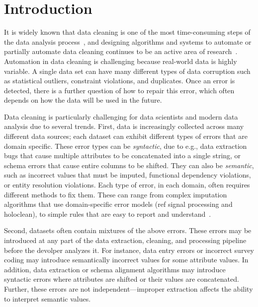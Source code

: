 \section{Introduction}\label{intro}\sloppy

It is widely known that data cleaning is one of the most time-consuming steps of the data analysis process~\cite{nytimes}, and designing algorithms and systems to automate or partially automate data cleaning continues to be an active area of research~\cite{DBLP:conf/sigmod/ChuIKW16}.  Automation in data cleaning is challenging because real-world data is highly variable.  A single data set can have many different types of data corruption such as statistical outliers, constraint violations, and duplicates.  Once an error is detected, there is a further question of how to repair this error, which often depends on how the data will be used in the future.

Data cleaning is particularly challenging for data scientists and modern data analysis due to several trends.  First, data is increasingly collected across many different data sources; each dataset can exhibit different types of errors that are domain specific.  These error types can be {\it syntactic}, due to e.g., data extraction bugs that cause multiple attributes to be concatenated into a single string, or schema errors that cause entire columns to be shifted.  They can also be {\it semantic}, such as incorrect values that must be imputed, functional dependency violations, or entity resolution violations.   Each type of error, in each domain, often requires different methods to fix them.  These can range from complex imputation algorithms that use domain-specific error models (ref signal processing and holoclean), to simple rules that are easy to report and understand~\cite{}.  

Second, datasets often contain mixtures of the above errors.  These errors may be introduced at any part of the data extraction, cleaning, and processing pipeline before the devolper analyzes it.  For instance, data entry errors or incorrect survey coding may introduce semantically incorrect values for some attribute values.  In addition, data extraction or schema alignment algorithms may introduce syntactic errors where attributes are shifted or their values are concatenated.  Further, these errors are not independent---improper extraction affects the ability to interpret semantic values.  

